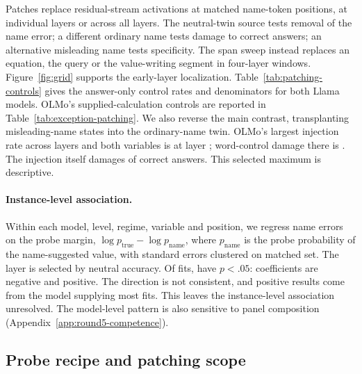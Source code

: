 Patches replace residual-stream activations at matched name-token positions, at individual
layers or across all layers. The neutral-twin source tests removal of the name error;
a different ordinary name tests damage to correct answers; an alternative misleading
name tests specificity. The span sweep instead replaces an equation, the query or the
value-writing segment in four-layer windows. Figure~\ref{fig:grid} supports the early-layer
localization. Table~\ref{tab:patching-controls} gives the answer-only control rates
and denominators for both Llama models.
OLMo's supplied-calculation controls are reported in Table~\ref{tab:exception-patching}.
We also reverse the main contrast, transplanting misleading-name states into the
ordinary-name twin. OLMo's largest injection rate across layers and both variables is
 at layer ; word-control damage there is
. The injection itself damages  of correct
answers. This selected maximum is descriptive.

\begin{table}[t]
\centering\small
{}
\caption{All-layer answer-only patches, demonstration set 7. Neutral and alternative:
percentage of baseline name errors removed. Word damage: percentage of correct
ordinary-name answers changed; \emph{Correct} gives that denominator.}
\label{tab:patching-controls}
\end{table}

\paragraph{Instance-level association.} Within each model, level, regime, variable and
position, we regress name errors on the probe margin, $\log p_{\mathrm{true}}-\log p_{\mathrm{name}}$,
where $p_{\mathrm{name}}$ is the probe probability of the name-suggested value,
with standard errors clustered on matched set. The layer is selected by neutral accuracy.
Of  fits,  have $p<.05$:  coefficients are negative
and  positive. The direction is not consistent, and 
positive results come from the model supplying most fits. This leaves the instance-level
association unresolved. The model-level pattern is also sensitive to panel composition
(Appendix~\ref{app:round5-competence}).

\subsection{Probe recipe and patching scope}

